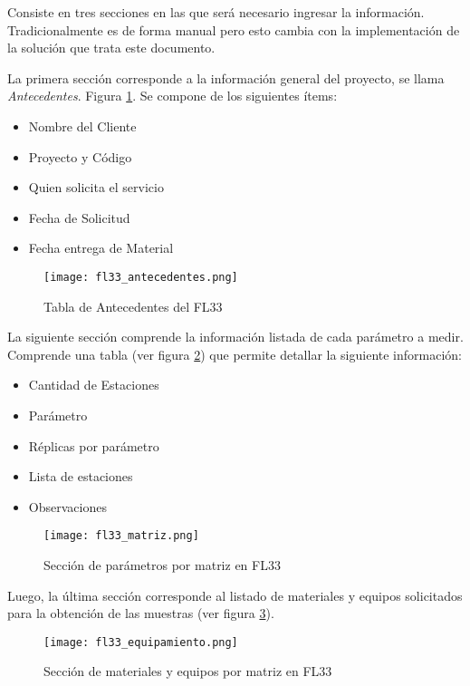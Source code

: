 Consiste en tres secciones en las que será necesario ingresar la información. Tradicionalmente es de forma manual pero esto cambia con la implementación de la solución que trata este documento.

La primera sección corresponde a la información general del proyecto, se llama \textit{Antecedentes}. Figura \ref{antecedentes_fl33}. Se compone de los siguientes ítems:

\begin{itemize}
	\item Nombre del Cliente
	\item Proyecto y Código
	\item Quien solicita el servicio
	\item Fecha de Solicitud
	\item Fecha entrega de Material
\end{itemize}

\begin{figure}
	\centering
	\texttt{[image: fl33\_antecedentes.png]}
	\caption{Tabla de Antecedentes del FL33}
	\label{antecedentes_fl33}
\end{figure}

La siguiente sección comprende la información listada de cada parámetro a medir. Comprende una tabla (ver figura \ref{matriz_fl33}) que permite detallar la siguiente información:

\begin{itemize}
\item Cantidad de Estaciones
\item Parámetro 
\item Réplicas por parámetro
\item Lista de estaciones
\item Observaciones
\end{itemize}

\begin{figure}
	\centering
	\texttt{[image: fl33\_matriz.png]}
	\caption{Sección de parámetros por matriz en FL33}
	\label{matriz_fl33}
\end{figure}

Luego, la última sección corresponde al listado de materiales y equipos solicitados para la obtención de las muestras (ver figura \ref{equipos_fl33}).

\begin{figure}
	\centering
	\texttt{[image: fl33\_equipamiento.png]}
	\caption{Sección de materiales y equipos por matriz en FL33}
	\label{equipos_fl33}
\end{figure}

